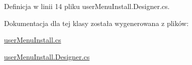 Definicja w linii 14 pliku user\+Menu\+Install.\+Designer.\+cs.



Dokumentacja dla tej klasy została wygenerowana z plików\+:\begin{DoxyCompactItemize}
\item 
\hyperlink{user_menu_install_8cs}{user\+Menu\+Install.\+cs}\item 
\hyperlink{user_menu_install_8_designer_8cs}{user\+Menu\+Install.\+Designer.\+cs}\end{DoxyCompactItemize}
